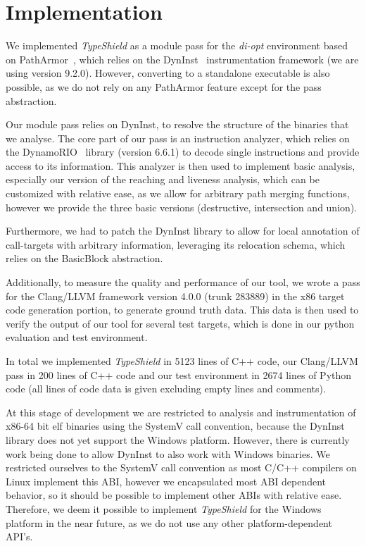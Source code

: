 \section{Implementation}
\label{chapter:Implementation}

We implemented \textit{TypeShield} as a module pass for the \textit{di-opt} environment based on PathArmor~\cite{veen:cfi}, 
which relies on the DynInst~\cite{bernat:dyninst} instrumentation framework (we are using version 9.2.0). 
However, converting to a standalone executable is also possible, as we do not rely on any PathArmor feature
except for the pass abstraction.

Our module pass relies on DynInst, to resolve the structure of the binaries that we analyse. The core part 
of our pass is an instruction analyzer, which relies on the DynamoRIO~\cite{dynamorio:drmemory} library 
(version 6.6.1) to decode single instructions and provide access to its information. This analyzer is then
used to implement basic analysis, especially our version of the reaching and liveness analysis, which can
be customized with relative ease, as we allow for arbitrary path merging functions, however we provide 
the three basic versions (destructive, intersection and union).

Furthermore, we had to patch the DynInst library to allow for local annotation of call-targets with arbitrary
information, leveraging its relocation schema, which relies on the BasicBlock abstraction.

Additionally, to measure the quality and performance of our tool, we wrote a pass for the Clang/LLVM framework
version 4.0.0 (trunk 283889) in the x86 target code generation portion, to generate ground truth data. This
data is then used to verify the output of our tool for several test targets, which is done in our python 
evaluation and test environment.

In total we implemented \textit{TypeShield} in 5123 lines of C++ code, our Clang/LLVM pass in 200 lines 
of C++ code and our test environment in 2674 lines of Python code (all lines of code data is given 
excluding empty lines and comments).

At this stage of development we are restricted to analysis and instrumentation of x86-64 bit elf 
binaries using the SystemV call convention, because the DynInst library does not yet support the
Windows platform. However, there is currently work being done to allow DynInst to also work with
Windows binaries. We restricted ourselves to the SystemV call convention as most C/C++ compilers
on Linux implement this ABI, however we encapsulated most ABI dependent behavior, so it should 
be possible to implement other ABIs with relative ease. Therefore, we deem it possible to implement
\textit{TypeShield} for the Windows platform in the near future, as we do not use any other 
platform-dependent API's. 

